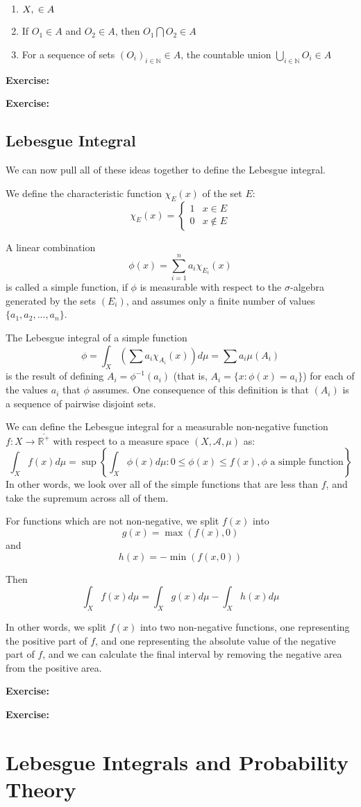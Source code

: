 \documentclass{article}
\begin{document}
\begin{enumerate}
\item $X, \null \in A$
\item If $O_1 \in A$ and $O_2 \in A$, then $O_1 \bigcap O_2 \in A$
\item For a sequence of sets $\left(O_i\right)_{i\in \mathbb{N}} \in A$, the countable
	union $\bigcup_{i\in \mathbb{N}} O_i \in A$
\end{enumerate}

\textbf{Exercise:}

\textbf{Exercise:}

\subsection{Lebesgue Integral}

We can now pull all of these ideas together to define the Lebesgue integral.

We define the characteristic function $\chi_E(x)$ of
the set $E$:
\[ \chi_E(x)=\left\{ 
\begin{array}{ll}
1 & x \in E\\
0 & x \notin E
\end{array} \right.
\]

A linear combination
\[ \phi(x) = \sum_{i=1}^{n}a_i\chi_{E_i}(x) \]
is called a simple function, if $\phi$ is measurable with respect to the $\sigma$-algebra
generated by the sets $(E_i)$, and assumes only a finite number of values
$\{a_1,a_2,...,a_n\}$. 

The Lebesgue integral of a simple function
\[\phi = \int_X \left( \sum a_i \chi_{A_i}(x)\right) d\mu = \sum a_i \mu(A_i) \]
is the result of defining $A_i = \phi^{-1}(a_i)$ (that is,
$A_i = \{x:\phi(x)=a_i\}$) for each of the values $a_i$ that $\phi$ assumes. One consequence
of this definition is that $\left(A_i\right)$ is a sequence of pairwise disjoint sets.

We can define the Lebesgue integral for a measurable non-negative function $f:X \rightarrow 
\overline{\mathbb{R}^{+}}$ with respect to a measure space $(X, \mathcal{A},\mu)$ as:
\[ \int_X f(x) d\mu = \sup\left\{\int_X \phi(x) d\mu: 0 \le \phi(x) \le f(x), \phi \textrm{ a
simple function} \right\} \]
In other words, we look over all of the simple functions that are less than $f$, and take
the supremum across all of them.

For functions which are not non-negative, we split $f(x)$ into
\[ g(x) = \max(f(x),0) \]
and
\[ h(x) = - \min(f(x,0)) \]

Then 
\[\int_X f(x) d\mu = \int_X g(x) d\mu - \int_X h(x) d\mu \]

In other words, we split $f(x)$ into two non-negative functions, one representing the positive
part of $f$, and one representing the absolute value of the negative part of $f$, and we can
calculate the final interval by removing the negative area from the positive area.

\textbf{Exercise:}

\textbf{Exercise:}


\section{Lebesgue Integrals and Probability Theory}
\end{document}
